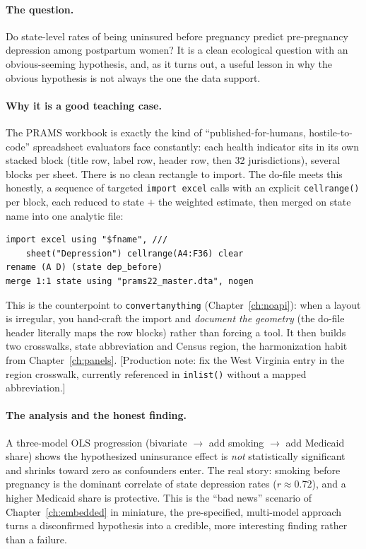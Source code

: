 \documentclass[
    a4paper,
    fontsize=10pt,
    twoside=true,
    numbers=noenddot,
]{kaobook}
\begin{document}
\paragraph{The question.} Do state-level rates of being uninsured before pregnancy predict pre-pregnancy depression among postpartum women? It is a clean ecological question with an obvious-seeming hypothesis, and, as it turns out, a useful lesson in why the obvious hypothesis is not always the one the data support.

\paragraph{Why it is a good teaching case.} The PRAMS workbook is exactly the kind of \enquote{published-for-humans, hostile-to-code} spreadsheet evaluators face constantly: each health indicator sits in its own stacked block (title row, label row, header row, then 32 jurisdictions), several blocks per sheet. There is no clean rectangle to import. The do-file meets this honestly, a sequence of targeted \texttt{import excel} calls with an explicit \texttt{cellrange()} per block, each reduced to state $+$ the weighted estimate, then merged on state name into one analytic file:
{\footnotesize
\begin{verbatim}
import excel using "$fname", ///
    sheet("Depression") cellrange(A4:F36) clear
rename (A D) (state dep_before)
merge 1:1 state using "prams22_master.dta", nogen
\end{verbatim}
}
This is the counterpoint to \texttt{convertanything} (Chapter~\ref{ch:noapi}): when a layout is irregular, you hand-craft the import and \emph{document the geometry} (the do-file header literally maps the row blocks) rather than forcing a tool. It then builds two crosswalks, state abbreviation and Census region, the harmonization habit from Chapter~\ref{ch:panels}. [Production note: fix the West Virginia entry in the region crosswalk, currently referenced in \texttt{inlist()} without a mapped abbreviation.]

\paragraph{The analysis and the honest finding.} A three-model OLS progression (bivariate $\rightarrow$ add smoking $\rightarrow$ add Medicaid share) shows the hypothesized uninsurance effect is \emph{not} statistically significant and shrinks toward zero as confounders enter. The real story: smoking before pregnancy is the dominant correlate of state depression rates ($r \approx 0.72$), and a higher Medicaid share is protective. This is the \enquote{bad news} scenario of Chapter~\ref{ch:embedded} in miniature, the pre-specified, multi-model approach turns a disconfirmed hypothesis into a credible, more interesting finding rather than a failure.
\end{document}
